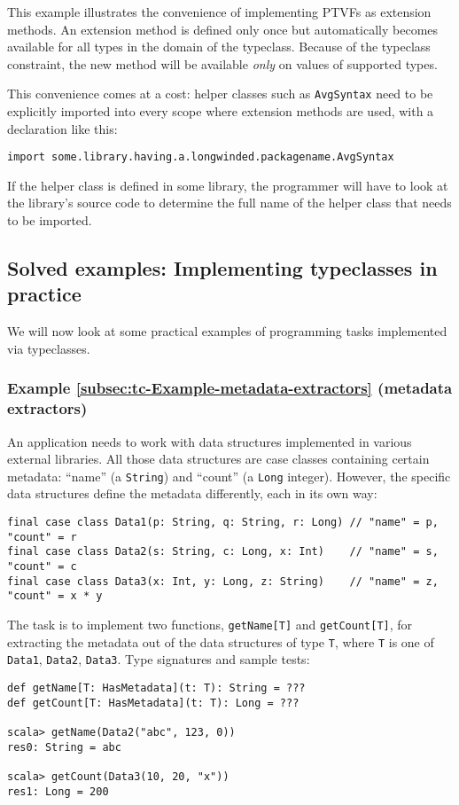 This example illustrates the convenience of implementing PTVFs as
extension methods. An extension method is defined only once but automatically
becomes available for all types in the domain of the typeclass. Because
of the typeclass constraint, the new method will be available \emph{only}
on values of supported types.

This convenience comes at a cost: helper classes such as \lstinline!AvgSyntax!
need to be explicitly imported into every scope where extension methods
are used, with a declaration like this:
\begin{lstlisting}
import some.library.having.a.longwinded.packagename.AvgSyntax
\end{lstlisting}
If the helper class is defined in some library, the programmer will
have to look at the library\textsf{'}s source code to determine the full name
of the helper class that needs to be imported.

\subsection{Solved examples: Implementing typeclasses in practice}

We will now look at some practical examples of programming tasks implemented
via typeclasses.

\subsubsection{Example \label{subsec:tc-Example-metadata-extractors}\ref{subsec:tc-Example-metadata-extractors}
(metadata extractors)}

An application needs to work with data structures implemented in various
external libraries. All those data structures are case classes containing
certain metadata: \textsf{``}name\textsf{''} (a \lstinline!String!) and \textsf{``}count\textsf{''}
(a \lstinline!Long! integer). However, the specific data structures
define the metadata differently, each in its own way:
\begin{lstlisting}
final case class Data1(p: String, q: String, r: Long) // "name" = p, "count" = r
final case class Data2(s: String, c: Long, x: Int)    // "name" = s, "count" = c
final case class Data3(x: Int, y: Long, z: String)    // "name" = z, "count" = x * y
\end{lstlisting}
The task is to implement two functions, \lstinline!getName[T]! and
\lstinline!getCount[T]!, for extracting the metadata out of the data
structures of type \lstinline!T!, where \lstinline!T! is one of
\lstinline!Data1!, \lstinline!Data2!, \lstinline!Data3!. Type signatures
and sample tests:
\begin{lstlisting}
def getName[T: HasMetadata](t: T): String = ???
def getCount[T: HasMetadata](t: T): Long = ???

scala> getName(Data2("abc", 123, 0))
res0: String = abc

scala> getCount(Data3(10, 20, "x"))
res1: Long = 200
\end{lstlisting}


